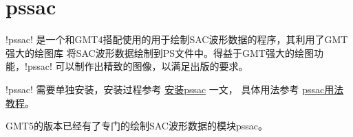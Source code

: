 \section{pssac}
\label{sec:pssac}

!pssac! 是一个和GMT4搭配使用的用于绘制SAC波形数据的程序，其利用了GMT强大的绘图库
将SAC波形数据绘制到PS文件中。得益于GMT强大的绘图功能，!pssac!
可以制作出精致的图像，以满足出版的要求。

!pssac! 需要单独安装，安装过程参考
\href{http://seisman.info/install-pssac.html}{安装pssac} 一文，
具体用法参考 \href{http://seisman.info/pssac-notes.html}{pssac用法教程}。

GMT5的版本已经有了专门的绘制SAC波形数据的模块pssac。
